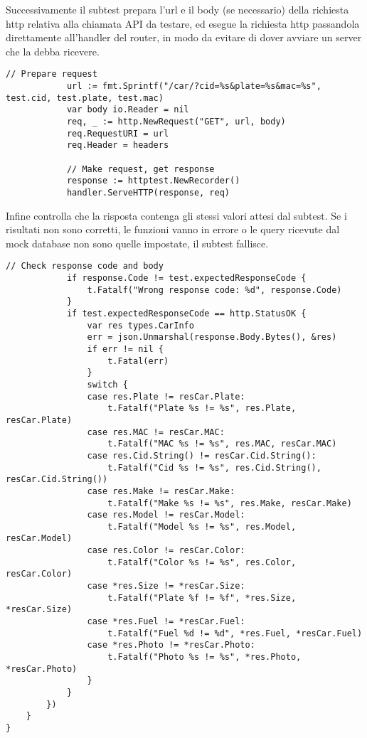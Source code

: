 \documentclass[italian, oneside]{sapthesis} %
\begin{document}
		Successivamente il subtest prepara l'url e il body (se necessario) della richiesta http relativa alla chiamata API da testare, ed  esegue la richiesta http passandola direttamente all'handler del router, in modo da evitare di dover avviare un server che la debba ricevere.

		\enlargethispage*{2\baselineskip}
		\begin{lstlisting}[breaklines=true]
			// Prepare request
			url := fmt.Sprintf("/car/?cid=%s&plate=%s&mac=%s", test.cid, test.plate, test.mac)
			var body io.Reader = nil
			req, _ := http.NewRequest("GET", url, body)
			req.RequestURI = url
			req.Header = headers

			// Make request, get response
			response := httptest.NewRecorder()
			handler.ServeHTTP(response, req)
		\end{lstlisting}

		Infine controlla che la risposta contenga gli stessi valori attesi dal subtest. Se i risultati non sono corretti, le funzioni vanno in errore o le query ricevute dal mock database non sono quelle impostate, il subtest fallisce.

		\begin{lstlisting}[framexbottommargin=5pt]
			// Check response code and body
			if response.Code != test.expectedResponseCode {
				t.Fatalf("Wrong response code: %d", response.Code)
			}
			if test.expectedResponseCode == http.StatusOK {
				var res types.CarInfo
				err = json.Unmarshal(response.Body.Bytes(), &res)
				if err != nil {
					t.Fatal(err)
				}
				switch {
				case res.Plate != resCar.Plate:
					t.Fatalf("Plate %s != %s", res.Plate, resCar.Plate)
				case res.MAC != resCar.MAC:
					t.Fatalf("MAC %s != %s", res.MAC, resCar.MAC)
				case res.Cid.String() != resCar.Cid.String():
					t.Fatalf("Cid %s != %s", res.Cid.String(), resCar.Cid.String())
				case res.Make != resCar.Make:
					t.Fatalf("Make %s != %s", res.Make, resCar.Make)
				case res.Model != resCar.Model:
					t.Fatalf("Model %s != %s", res.Model, resCar.Model)
				case res.Color != resCar.Color:
					t.Fatalf("Color %s != %s", res.Color, resCar.Color)
				case *res.Size != *resCar.Size:
					t.Fatalf("Plate %f != %f", *res.Size, *resCar.Size)
				case *res.Fuel != *resCar.Fuel:
					t.Fatalf("Fuel %d != %d", *res.Fuel, *resCar.Fuel)
				case *res.Photo != *resCar.Photo:
					t.Fatalf("Photo %s != %s", *res.Photo, *resCar.Photo)
				}
			}
		})
	}
}
		\end{lstlisting}


\end{document}

